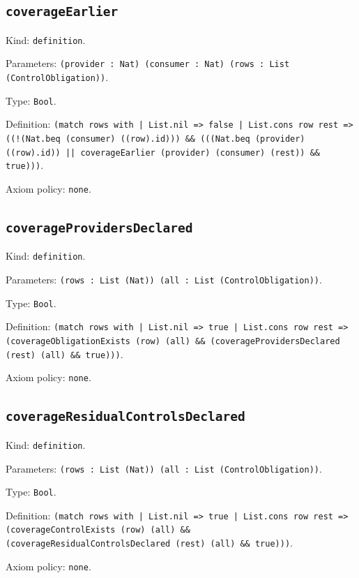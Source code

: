 \documentclass[11pt]{article}
\begin{document}
\subsection*{\texttt{coverageEarlier}}
\noindent Kind: \texttt{definition}.\par
\noindent Parameters: \texttt{(provider : Nat) (consumer : Nat) (rows : List (ControlObligation))}.\par
\noindent Type: \texttt{Bool}.\par
\noindent Definition: \texttt{(match rows with | List.nil => false | List.cons row rest => ((!(Nat.beq (consumer) ((row).id))) \&\& (((Nat.beq (provider) ((row).id)) || coverageEarlier (provider) (consumer) (rest)) \&\& true)))}.\par
\noindent Axiom policy: \texttt{none}.\par
\subsection*{\texttt{coverageProvidersDeclared}}
\noindent Kind: \texttt{definition}.\par
\noindent Parameters: \texttt{(rows : List (Nat)) (all : List (ControlObligation))}.\par
\noindent Type: \texttt{Bool}.\par
\noindent Definition: \texttt{(match rows with | List.nil => true | List.cons row rest => (coverageObligationExists (row) (all) \&\& (coverageProvidersDeclared (rest) (all) \&\& true)))}.\par
\noindent Axiom policy: \texttt{none}.\par
\subsection*{\texttt{coverageResidualControlsDeclared}}
\noindent Kind: \texttt{definition}.\par
\noindent Parameters: \texttt{(rows : List (Nat)) (all : List (ControlObligation))}.\par
\noindent Type: \texttt{Bool}.\par
\noindent Definition: \texttt{(match rows with | List.nil => true | List.cons row rest => (coverageControlExists (row) (all) \&\& (coverageResidualControlsDeclared (rest) (all) \&\& true)))}.\par
\noindent Axiom policy: \texttt{none}.\par
\end{document}
